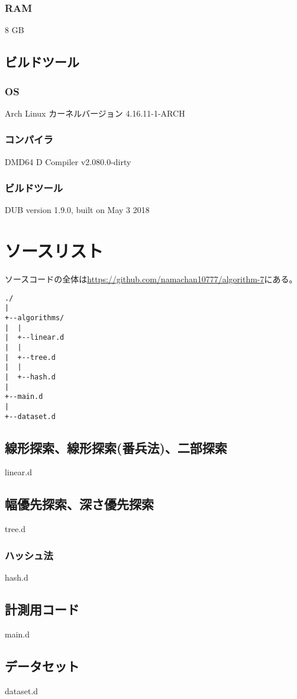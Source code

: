 \documentclass[dvipdfmx]{jsarticle}
\begin{document}
			\subsubsection{RAM}
				8 GB
		\subsection{ビルドツール}
			\subsubsection{OS}
				Arch Linux
				カーネルバージョン 4.16.11-1-ARCH
			\subsubsection{コンパイラ}
				DMD64 D Compiler v2.080.0-dirty
			\subsubsection{ビルドツール}
				DUB version 1.9.0, built on May  3 2018
	\section{ソースリスト}
		ソースコードの全体は\url{https://github.com/namachan10777/algorithm-7}にある。
		\begin{verbatim}
./
|
+--algorithms/
|  |
|  +--linear.d
|  |
|  +--tree.d
|  |
|  +--hash.d
|
+--main.d
|
+--dataset.d
		\end{verbatim}
		\subsection{線形探索、線形探索(番兵法)、二部探索}
			linear.d
			\newpage
		\subsection{幅優先探索、深さ優先探索}
			tree.d
			\newpage
		\subsubsection{ハッシュ法}
			hash.d
			\newpage
		\subsection{計測用コード}
			main.d
			\newpage
		\subsection{データセット}
			dataset.d
			\newpage
\end{document}
